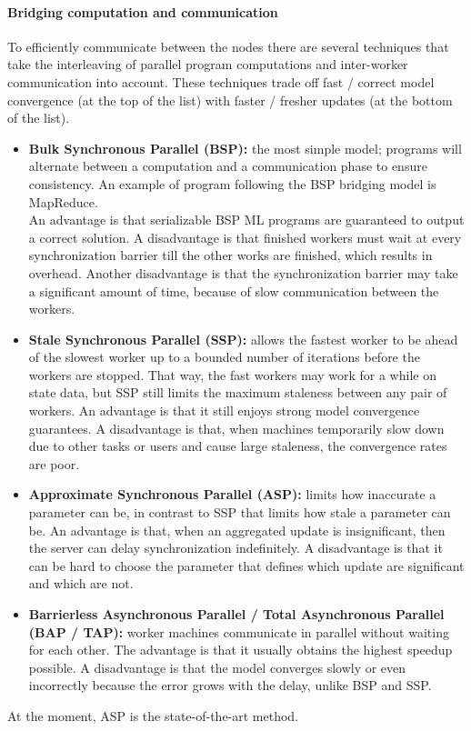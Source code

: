 \paragraph{Bridging computation and communication}
To efficiently communicate between the nodes there are several techniques that take the interleaving of parallel program computations and inter-worker communication into account. These techniques trade off fast / correct model convergence (at the top of the list) with faster / fresher updates (at the bottom of the list).
\begin{itemize}
	\item \textbf{Bulk Synchronous Parallel (BSP):} the most simple model; programs will alternate between a computation and a communication phase to ensure consistency\cite{Xing16}. An example of program following the BSP bridging model is MapReduce.\\
	An advantage is that serializable BSP ML programs are guaranteed to output a correct solution. A disadvantage is that finished workers must wait at every synchronization barrier till the other works are finished, which results in overhead\cite{Chilimbi14}. Another disadvantage is that the synchronization barrier may take a significant amount of time, because of slow communication between the workers.
	\item \textbf{Stale Synchronous Parallel (SSP):} allows the fastest worker to be ahead of the slowest worker up to a bounded number of iterations before the workers are stopped. That way, the fast workers may work for a while on state data, but SSP still limits the maximum staleness between any pair of workers. An advantage is that it still enjoys strong model convergence guarantees. A disadvantage is that, when machines temporarily slow down due to other tasks or users and cause large staleness, the convergence rates are poor.
	\item \textbf{Approximate Synchronous Parallel (ASP):} limits how inaccurate a parameter can be, in contrast to SSP that limits how stale a parameter can be. An advantage is that, when an aggregated update is insignificant, then the server can delay synchronization indefinitely. A disadvantage is that it can be hard to choose the parameter that defines which update are significant and which are not. \cite{Hsieh17}
	\item \textbf{Barrierless Asynchronous Parallel\cite{Han15} / Total Asynchronous Parallel\cite{Hsieh17} (BAP / TAP):} worker machines communicate in parallel without waiting for each other. The advantage is that it usually obtains the highest speedup possible. A disadvantage is that the model converges slowly or even incorrectly because the error grows with the delay, unlike BSP and SSP. \cite{Han15}
\end{itemize}
At the moment, ASP is the state-of-the-art method.


